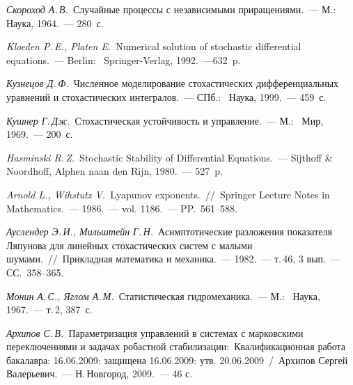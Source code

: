 \begin{thebibliography}{wlab}

\emph{Скороход А.\,В.}~Случайные процессы с независимыми приращениями.~--- М.:~ Наука, 1964.~--- 280~с.

\emph{Kloeden P.\,E., Platen E.}~Numerical solution of stochastic differential equations.~--- Berlin:~ Springer-Verlag, 1992.~---632~p.

\emph{Кузнецов Д.\,Ф.}~Численное моделирование стохастических дифференциальных уравнений и стохастических интегралов.~--- СПб.:~ Наука, 1999.~--- 459~с.

\emph{Кушнер Г.\,Дж.}~Стохастическая устойчивость и управление.~--- М.:~ Мир, 1969.~--- 200~с.

\emph{Hasminski R.\,Z.}~Stochastic Stability of Differential Equations.~--- Sijthoff \& Noordhoff, Alphen naan den Rijn, 1980.~--- 527~p.

\emph{Arnold L., Wihstutz V.}~Lyapunov exponents.~//~Springer Lecture Notes in Mathematics.~--- 1986.~--- vol. 1186.~--- PP.~561--588.

\emph{Ауслендер Э.\,И., Мильштейн Г.\,Н.}~Асимптотические разложения показателя Ляпунова для линейных стохастических систем с малыми шумами.~//~Прикладная математика и механика.~--- 1982.~--- т.\,46, 3 вып.~--- СС.~358--365.


\emph{Монин А.\,С., Яглом А.\,М.}~Статистическая гидромеханика.~--- М.:~ Наука, 1967.~--- т.\,2, 387~с.

\emph{Архипов С.\,В.}~Параметризация управлений в системах с марковскими переключениями и задачах робастной стабилизации:~Квалификационная работа бакалавра: 16.06.2009: защищена 16.06.2009: утв. 20.06.2009~/~Архипов Сергей Валерьевич.~--- Н.\,Новгород, 2009.~--- 46 с.

\end{thebibliography}
